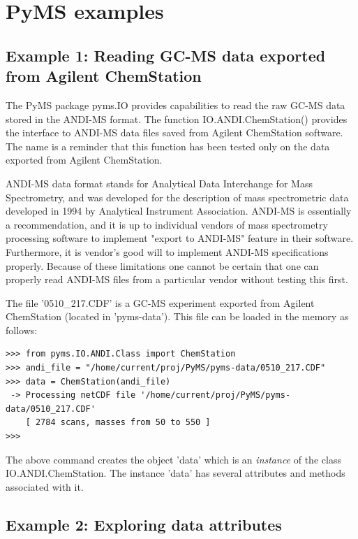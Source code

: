 \section{PyMS examples}

\subsection{Example 1: Reading GC-MS data exported from Agilent ChemStation}

The PyMS package pyms.IO provides capabilities to read the raw GC-MS
data stored in the ANDI-MS format. The function IO.ANDI.ChemStation()
provides the interface to ANDI-MS data files saved from Agilent
ChemStation software. The name is a reminder that this function has
been tested only on the data exported from Agilent ChemStation.

ANDI-MS data format stands for Analytical Data Interchange for Mass
Spectrometry, and was developed for the description of mass spectrometric
data developed in 1994 by Analytical Instrument Association. ANDI-MS 
is essentially a recommendation, and it is up to individual vendors of
mass spectrometry processing software to implement "export to ANDI-MS"
feature in their software. Furthermore, it is vendor's good will to
implement ANDI-MS specifications properly. Because of these limitations
one cannot be certain that one can properly read ANDI-MS files from
a particular vendor without testing this first.

The file '0510\_217.CDF' is a GC-MS experiment exported from Agilent
ChemStation (located in 'pyms-data'). This file can be loaded in the
memory as follows:

\begin{verbatim}
>>> from pyms.IO.ANDI.Class import ChemStation
>>> andi_file = "/home/current/proj/PyMS/pyms-data/0510_217.CDF"
>>> data = ChemStation(andi_file)
 -> Processing netCDF file '/home/current/proj/PyMS/pyms-data/0510_217.CDF'
    [ 2784 scans, masses from 50 to 550 ]
>>>
\end{verbatim}

\noindent
The above command creates the object 'data' which is an {\em instance}
of the class IO.ANDI.ChemStation.  The instance 'data' has several
attributes and methods associated with it.

\subsection{Example 2: Exploring data attributes}

